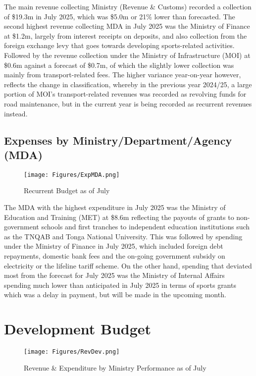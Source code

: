 \documentclass[11pt,a4paper]{setup}
\begin{document}
The main revenue collecting Ministry (Revenue \& Customs) recorded a collection of \$19.3m in July 2025, which was \$5.0m or 21\% lower than forecasted. 
The second highest revenue collecting MDA in July 2025 was the Ministry of Finance at \$1.2m, largely from interest receipts on deposits, and also collection from the foreign exchange levy that goes towards developing sports-related activities.
Followed by the revenue collection under the Ministry of Infrastructure (MOI) at \$0.6m against a forecast of \$0.7m, of which the slightly lower collection was mainly from transport-related fees. The higher variance year-on-year however, reflects the change in classification, whereby in the previous year 2024/25, a large portion of MOI's transport-related revenues was recorded as revolving funds for road maintenance, but in the current year is being recorded as recurrent revenues instead.  


\subsection*{Expenses by Ministry/Department/Agency (MDA)}
\begin{figure}[H]
    		\centering
    		\texttt{[image: Figures/ExpMDA.png]}
    		\caption{Recurrent Budget as of July}
    		\label{fig:figure}
    	\end{figure}

The MDA with the highest expenditure in July 2025 was the Ministry of Education and Training (MET) at \$8.6m reflecting the payouts of grants to non-government schools and first tranches to independent education institutions such as the TNQAB and Tonga National University.
This was followed by spending under the Ministry of Finance in July 2025, which included foreign debt repayments, domestic bank fees and the on-going government subsidy on electricity or the lifeline tariff scheme.
On the other hand, spending that deviated most from the forecast for July 2025 was the Ministry of Internal Affairs spending much lower than anticipated in July 2025 in terms of sports grants which was a delay in payment, but will be made in the upcoming month.


\section*{Development Budget}
\begin{figure}[H]
    		\centering
    		\texttt{[image: Figures/RevDev.png]}
    		\caption{Revenue \& Expenditure by Ministry Performance as of July}
    		\label{fig:figure}
    	\end{figure}
\end{document}
